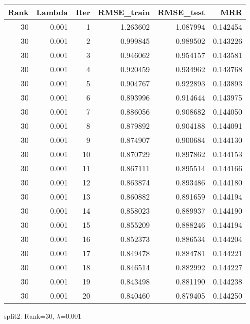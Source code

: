 \begin{tabular}{rrrrrr}
\toprule
 Rank &  Lambda &  Iter &  RMSE\_train &  RMSE\_test &       MRR \\
\midrule
   30 &   0.001 &     1 &    1.263602 &   1.087994 &  0.142454 \\
   30 &   0.001 &     2 &    0.999845 &   0.989502 &  0.143226 \\
   30 &   0.001 &     3 &    0.946062 &   0.954157 &  0.143581 \\
   30 &   0.001 &     4 &    0.920459 &   0.934962 &  0.143768 \\
   30 &   0.001 &     5 &    0.904767 &   0.922893 &  0.143893 \\
   30 &   0.001 &     6 &    0.893996 &   0.914644 &  0.143975 \\
   30 &   0.001 &     7 &    0.886056 &   0.908682 &  0.144050 \\
   30 &   0.001 &     8 &    0.879892 &   0.904188 &  0.144091 \\
   30 &   0.001 &     9 &    0.874907 &   0.900684 &  0.144130 \\
   30 &   0.001 &    10 &    0.870729 &   0.897862 &  0.144153 \\
   30 &   0.001 &    11 &    0.867111 &   0.895514 &  0.144166 \\
   30 &   0.001 &    12 &    0.863874 &   0.893486 &  0.144180 \\
   30 &   0.001 &    13 &    0.860882 &   0.891659 &  0.144194 \\
   30 &   0.001 &    14 &    0.858023 &   0.889937 &  0.144190 \\
   30 &   0.001 &    15 &    0.855209 &   0.888246 &  0.144194 \\
   30 &   0.001 &    16 &    0.852373 &   0.886534 &  0.144204 \\
   30 &   0.001 &    17 &    0.849478 &   0.884781 &  0.144221 \\
   30 &   0.001 &    18 &    0.846514 &   0.882992 &  0.144227 \\
   30 &   0.001 &    19 &    0.843498 &   0.881190 &  0.144238 \\
   30 &   0.001 &    20 &    0.840460 &   0.879405 &  0.144250 \\
\bottomrule
\end{tabular}

\caption{split2: Rank=30, $\lambda$=0.001}
